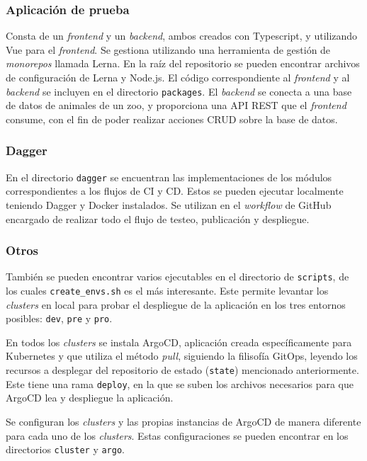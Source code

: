 \subsubsection*{Aplicación de prueba}

Consta de un \textit{frontend} y un \textit{backend}, ambos creados con Typescript, y utilizando Vue para el \textit{frontend}. Se gestiona utilizando una herramienta de gestión de \textit{monorepos} llamada Lerna. En la raíz del repositorio se pueden encontrar archivos de configuración de Lerna y Node.js. El código correspondiente al \textit{frontend} y al \textit{backend} se incluyen en el directorio \texttt{packages}. El \textit{backend} se conecta a una base de datos de animales de un zoo, y proporciona una API REST que el \textit{frontend} consume, con el fin de poder realizar acciones CRUD sobre la base de datos.

\subsubsection*{Dagger}

En el directorio \texttt{dagger} se encuentran las implementaciones de los módulos correspondientes a los flujos de CI y CD. Estos se pueden ejecutar localmente teniendo Dagger y Docker instalados. Se utilizan en el \textit{workflow} de GitHub encargado de realizar todo el flujo de testeo, publicación y despliegue.

\subsubsection*{Otros}

También se pueden encontrar varios ejecutables en el directorio de \texttt{scripts}, de los cuales \texttt{create\_envs.sh} es el más interesante. Este permite levantar los \textit{clusters} en local para probar el despliegue de la aplicación en los tres entornos posibles: \texttt{dev}, \texttt{pre} y \texttt{pro}.

En todos los \textit{clusters} se instala ArgoCD, aplicación creada específicamente para Kubernetes y que utiliza el método \textit{pull}, siguiendo la filisofía GitOps, leyendo los recursos a desplegar del repositorio de estado (\texttt{state}) mencionado anteriormente. Este tiene una rama \texttt{deploy}, en la que se suben los archivos necesarios para que ArgoCD lea y despliegue la aplicación.

Se configuran los \textit{clusters} y las propias instancias de ArgoCD de manera diferente para cada uno de los \textit{clusters}. Estas configuraciones se pueden encontrar en los directorios \texttt{cluster} y \texttt{argo}.

